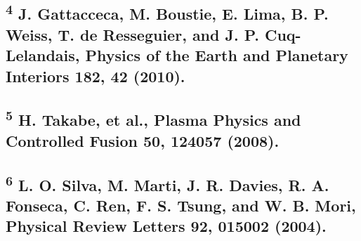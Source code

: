 

\subsection{\texorpdfstring{\textsuperscript{4} J. Gattacceca, M.
Boustie, E. Lima, B. P. Weiss, T. de Resseguier, and J. P.
Cuq-Lelandais, Physics of the Earth and Planetary Interiors 182, 42
(2010).}{4 J. Gattacceca, M. Boustie, E. Lima, B. P. Weiss, T. de Resseguier, and J. P. Cuq-Lelandais, Physics of the Earth and Planetary Interiors 182, 42 (2010).}}\label{j.-gattacceca-m.-boustie-e.-lima-b.-p.-weiss-t.-de-resseguier-and-j.-p.-cuq-lelandais-physics-of-the-earth-and-planetary-interiors-182-42-2010.}

\subsection{\texorpdfstring{\textsuperscript{5} H. Takabe, et al.,
Plasma Physics and Controlled Fusion 50, 124057
(2008).}{5 H. Takabe, et al., Plasma Physics and Controlled Fusion 50, 124057 (2008).}}\label{h.-takabe-et-al.-plasma-physics-and-controlled-fusion-50-124057-2008.}

\subsection{\texorpdfstring{\textsuperscript{6} L. O. Silva, M. Marti,
J. R. Davies, R. A. Fonseca, C. Ren, F. S. Tsung, and W. B. Mori,
Physical Review Letters 92, 015002
(2004).}{6 L. O. Silva, M. Marti, J. R. Davies, R. A. Fonseca, C. Ren, F. S. Tsung, and W. B. Mori, Physical Review Letters 92, 015002 (2004).}}\label{l.-o.-silva-m.-marti-j.-r.-davies-r.-a.-fonseca-c.-ren-f.-s.-tsung-and-w.-b.-mori-physical-review-letters-92-015002-2004.}

